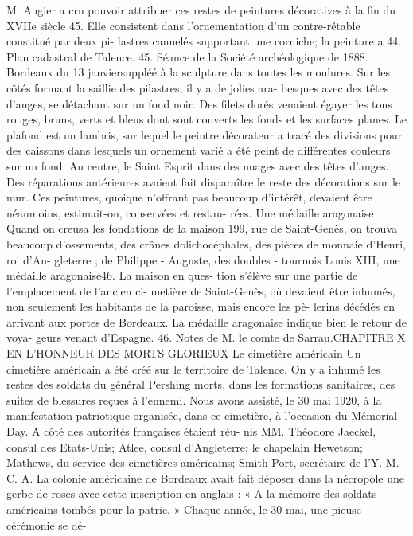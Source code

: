 \documentclass[a4paper,11pt]{book}
\begin{document}
M. Augier a cru pouvoir attribuer ces restes de peintures
décoratives à la fin du XVIIe siècle 45. Elle consistent dans
l'ornementation d'un contre-rétable constitué par deux pi-
lastres cannelés supportant une corniche; la peinture a
44. Plan cadastral de Talence.
45. Séance de la Société archéologique de
1888.
Bordeaux du 13 janviersuppléé à la sculpture dans toutes les moulures. Sur les
côtés formant la saillie des pilastres, il y a de jolies ara-
besques avec des têtes d'anges, se détachant sur un fond
noir. Des filets dorés venaient égayer les tons rouges,
bruns, verts et bleus dont sont couverts les fonds et les
surfaces planes. Le plafond est un lambris, sur lequel le
peintre décorateur a tracé des divisions pour des caissons
dans lesquels un ornement varié a été peint de différentes
couleurs sur un fond. Au centre, le Saint Esprit dans des
nuages avec des têtes d'anges.
Des réparations antérieures avaient fait disparaître le
reste des décorations sur le mur.
Ces peintures, quoique n'offrant pas beaucoup d'intérêt,
devaient être néanmoins, estimait-on, conservées et restau-
rées.
Une médaille aragonaise
Quand on creusa les fondations de la maison 199, rue de
Saint-Genès, on trouva beaucoup d'ossements, des crânes
dolichocéphales, des pièces de monnaie d'Henri, roi d'An-
gleterre ; de Philippe - Auguste, des doubles - tournois
Louis XIII, une médaille aragonaise46. La maison en ques-
tion s'élève sur une partie de l'emplacement de l'ancien ci-
metière de Saint-Genès, où devaient être inhumés, non
seulement les habitants de la paroisse, mais encore les pè-
lerins décédés en arrivant aux portes de Bordeaux.
La médaille aragonaise indique bien le retour de voya-
geurs venant d'Espagne.
46. Notes de M. le comte de Sarrau.CHAPITRE X
EN L'HONNEUR
DES MORTS GLORIEUX
Le cimetière américain
Un cimetière américain a été créé sur le territoire de
Talence. On y a inhumé les restes des soldats du général
Pershing morts, dans les formations sanitaires, des suites
de blessures reçues à l'ennemi.
Nous avons assisté, le 30 mai 1920, à la manifestation
patriotique organisée, dans ce cimetière, à l'occasion du
Mémorial Day. A côté des autorités françaises étaient réu-
nis MM. Théodore Jaeckel, consul des Etats-Unis; Atlee,
consul d'Angleterre; le chapelain Hewetson; Mathews, du
service des cimetières américains; Smith Port, secrétaire
de l'Y. M. C. A. La colonie américaine de Bordeaux avait
fait déposer dans la nécropole une gerbe de roses avec
cette inscription en anglais : « A la mémoire des soldats
américains tombés pour la patrie. »
Chaque année, le 30 mai, une pieuse cérémonie se dé-
\end{document}
